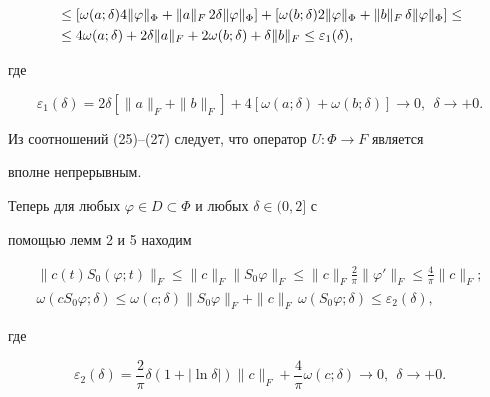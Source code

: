 \begin{pf}
\begin{align}
&\le[\omega(a;\delta)4\|\varphi\|_\Phi+\|a\|_F\,2\delta 


\|\varphi\|_\Phi]+[\omega(b;\delta)2\|\varphi\|_\Phi+ 


\|b\|_F\,\delta\|\varphi\|_\Phi]\le\notag \\ 


&\le4\omega(a;\delta)+2\delta\|a\|_F+2\omega(b;\delta) 


+\delta\|b\|_F\le\varepsilon_1(\delta), 


\end{align} 


где 


\begin{equation} 


\varepsilon_1(\delta)=2\delta[\|a\|_F+\|b\|_F]+ 


4[\omega(a;\delta)+\omega(b;\delta)]\to0, 


\ \ \delta\to+0. 


\end{equation} 


Из соотношений (25)--(27) следует, что оператор $U:\Phi\to F$ является 


вполне непрерывным. 


 


Теперь для любых $\varphi\in D\subset\Phi$ и любых $\delta\in(0,2]$ с 


помощью лемм 2 и 5 находим 


\begin{gather} 


\|c(t)S_0(\varphi;t)\|_F\le\|c\|_F\|S_0\varphi\|_F\le 


\|c\|_F\frac{2}{\pi}\|\varphi'\|_F\le\frac{4}{\pi} \|c\|_F; \\ 


% 


\omega(c S_0\varphi;\delta)\le\omega(c;\delta) 


\|S_0\varphi\|_F+\|c\|_F\,\omega(S_0\varphi;\delta)\le 


\varepsilon_2(\delta), 


\end{gather} 


где 


\begin{equation} 


\varepsilon_2(\delta)=\frac{2}{\pi}\delta(1+|\ln\delta|) 


\|c\|_F+\frac{4}{\pi}\omega(c;\delta)\to0,\ \ \delta\to+0. 



\end{equation}
\end{pf}
